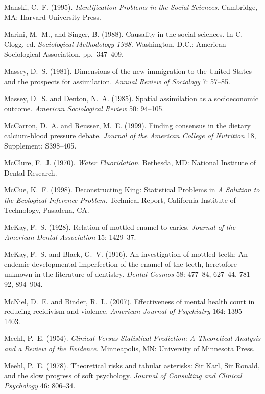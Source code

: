\smallskip\noindent
Manski, C.~F. (1995).
{\it Identification Problems in the Social Sciences\/}.
Cambridge, MA: Harvard University Press.

\smallskip\noindent
Marini, M.~M., and Singer, B. (1988).
Causality in the social sciences.
In C. Clogg, ed. {\it Sociological Methodology 1988\/}.
Washington, D.C.: American Sociological Association, pp.~347--409.

\smallskip\noindent
Massey, D.~S. (1981).
Dimensions of the new immigration to the United States and the prospects for assimilation.
{\it Annual Review of Sociology\/} 7: 57--85.

\smallskip\noindent
Massey, D.~S. and Denton, N.~A. (1985).
Spatial assimilation as a socioeconomic outcome.
{\it American Sociological Review\/} 50: 94--105.

\smallskip\noindent
McCarron, D.~A. and Reusser, M.~E. (1999).
Finding consensus in the dietary calcium-blood pressure debate.
{\it Journal of the American College of Nutrition\/} 18, Supplement: S398--405.

\smallskip\noindent
McClure, F.~J. (1970).
{\it Water Fluoridation\/}.
Bethesda, MD: National Institute of Dental Research.

\smallskip\noindent
McCue, K.~F. (1998).
Deconstructing King: Statistical Problems in {\it A Solution to the Ecological Inference Problem\/}.
Technical Report, California Institute of Technology, Pasadena, CA.

\smallskip\noindent
McKay, F.~S. (1928).
Relation of mottled enamel to caries.
{\it Journal of the American Dental Association\/} 15: 1429--37.

\smallskip\noindent
McKay, F.~S. and Black, G.~V. (1916).
An investigation of mottled teeth: An endemic developmental imperfection of the enamel of the
teeth, heretofore unknown in the literature of dentistry.
{\it Dental Cosmos\/} 58: 477--84, 627--44, 781--92, 894--904.

\smallskip\noindent
McNiel, D.~E. and Binder, R.~L. (2007).
Effectiveness of mental health court in reducing recidivism and violence.
{\it American Journal of Psychiatry\/} 164: 1395--1403.

\smallskip\noindent
Meehl, P.~E. (1954).
{\it Clinical Versus Statistical Prediction:
A Theoretical Analysis and a Review of the Evidence\/}.
Minneapolis, MN: University of Minnesota Press.

\smallskip\noindent
Meehl, P.~E. (1978).
Theoretical risks and tabular asterisks:
Sir Karl, Sir Ronald, and the slow progress of soft psychology.
{\it Journal of Consulting and Clinical Psychology\/} 46: 806--34.

